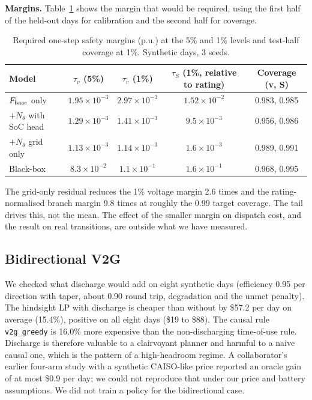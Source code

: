 \documentclass[11pt]{article}
\begin{document}
\textbf{Margins.} Table~\ref{tab:wm2} shows the margin that would be required, using the first half of the held-out days for calibration and the second half for coverage.
\begin{table}[h]\centering\small
\begin{tabular}{@{}lcccc@{}}\toprule Model & $\tau_v$ (5\%) & $\tau_v$ (1\%) & $\tau_S$ (1\%, relative to rating) & Coverage (v, S)\\\midrule
$F_{\rm base}$ only & $1.95\times10^{-3}$ & $2.97\times10^{-3}$ & $1.52\times10^{-2}$ & 0.983, 0.985\\
$+N_\theta$ with SoC head & $1.29\times10^{-3}$ & $1.41\times10^{-3}$ & $9.5\times10^{-3}$ & 0.956, 0.986\\
$+N_\theta$ grid only & $1.13\times10^{-3}$ & $1.14\times10^{-3}$ & $1.6\times10^{-3}$ & 0.989, 0.991\\
Black-box & $8.3\times10^{-2}$ & $1.1\times10^{-1}$ & $1.6\times10^{-1}$ & 0.968, 0.995\\\bottomrule
\end{tabular}\caption{Required one-step safety margins (p.u.) at the 5\% and 1\% levels and test-half coverage at 1\%. Synthetic days, 3 seeds.}\label{tab:wm2}\end{table}
The grid-only residual reduces the 1\% voltage margin 2.6 times and the rating-normalised branch margin 9.8 times at roughly the 0.99 target coverage. The tail drives this, not the mean. The effect of the smaller margin on dispatch cost, and the result on real transitions, are outside what we have measured.

\subsection{Bidirectional V2G}\label{sec:v2g}
We checked what discharge would add on eight synthetic days (efficiency 0.95 per direction with taper, about 0.90 round trip, degradation and the unmet penalty). The hindsight LP with discharge is cheaper than without by \$57.2 per day on average (15.4\%), positive on all eight days (\$19 to \$88). The causal rule \texttt{v2g\_greedy} is 16.0\% more expensive than the non-discharging time-of-use rule. Discharge is therefore valuable to a clairvoyant planner and harmful to a naive causal one, which is the pattern of a high-headroom regime. A collaborator's earlier four-arm study with a synthetic CAISO-like price reported an oracle gain of at most \$0.9 per day; we could not reproduce that under our price and battery assumptions. We did not train a policy for the bidirectional case.
\end{document}
